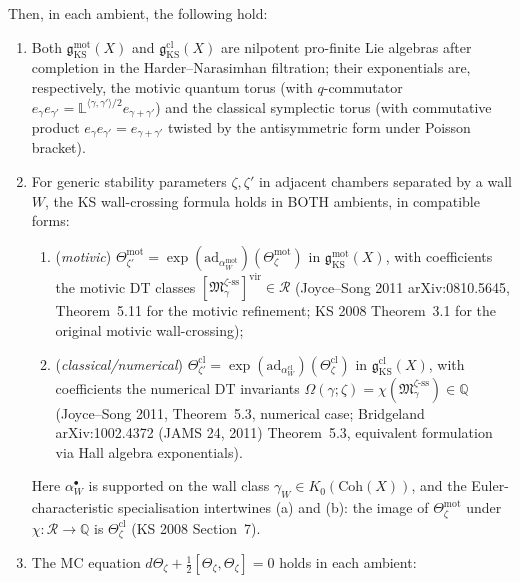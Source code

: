 \begin{theorem}
Then, in each ambient, the following hold:

\begin{enumerate}[label=\textup{(\roman*)}]
 \item Both $\mathfrak{g}_{\mathrm{KS}}^{\mathrm{mot}}(X)$ and
 $\mathfrak{g}_{\mathrm{KS}}^{\mathrm{cl}}(X)$ are nilpotent
 pro-finite Lie algebras after completion in the Harder--Narasimhan
 filtration; their exponentials are, respectively, the motivic
 quantum torus (with $q$-commutator
 $e_\gamma e_{\gamma'} = \mathbb{L}^{\langle\gamma,\gamma'\rangle/2}
 e_{\gamma + \gamma'}$) and the classical symplectic torus (with
 commutative product $e_\gamma e_{\gamma'} = e_{\gamma + \gamma'}$
 twisted by the antisymmetric form under Poisson bracket).
 \item For generic stability parameters $\zeta, \zeta'$ in adjacent
 chambers separated by a wall $W$, the KS wall-crossing formula
 holds in BOTH ambients, in compatible forms:
 \begin{enumerate}[label=\textup{(\alph*)}]
 \item (\emph{motivic})
 $\Theta^{\mathrm{mot}}_{\zeta'} = \exp(\mathrm{ad}_{\alpha_W^{\mathrm{mot}}})
 (\Theta^{\mathrm{mot}}_\zeta)$
 in $\mathfrak{g}_{\mathrm{KS}}^{\mathrm{mot}}(X)$, with
 coefficients the motivic DT classes
 $[\mathfrak{M}_\gamma^{\zeta\text{-ss}}]^{\mathrm{vir}}
 \in \mathcal{R}$
 (Joyce--Song 2011 \textup{arXiv:0810.5645}, Theorem~5.11 for
 the motivic refinement; KS 2008 Theorem~3.1 for the original
 motivic wall-crossing);
 \item (\emph{classical/numerical})
 $\Theta^{\mathrm{cl}}_{\zeta'} = \exp(\mathrm{ad}_{\alpha_W^{\mathrm{cl}}})
 (\Theta^{\mathrm{cl}}_\zeta)$
 in $\mathfrak{g}_{\mathrm{KS}}^{\mathrm{cl}}(X)$, with
 coefficients the numerical DT invariants
 $\Omega(\gamma; \zeta) = \chi(\mathfrak{M}_\gamma^{\zeta\text{-ss}})
 \in \mathbb{Q}$
 (Joyce--Song 2011, Theorem~5.3, numerical case; Bridgeland
 \textup{arXiv:1002.4372} (JAMS 24, 2011) Theorem~5.3,
 equivalent formulation via Hall algebra exponentials).
 \end{enumerate}
 Here $\alpha_W^\bullet$ is supported on the wall class
 $\gamma_W \in K_0(\mathrm{Coh}(X))$, and the Euler-characteristic
 specialisation intertwines (a) and (b): the image of
 $\Theta_\zeta^{\mathrm{mot}}$ under
 $\chi \colon \mathcal{R} \to \mathbb{Q}$
 is $\Theta_\zeta^{\mathrm{cl}}$ (KS 2008 Section~7).
 \item The MC equation
 $d\Theta_\zeta + \frac{1}{2}[\Theta_\zeta, \Theta_\zeta] = 0$
 holds in each ambient:

\end{enumerate}
\end{theorem}
